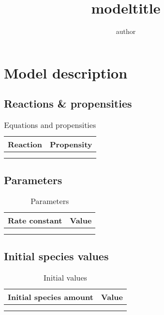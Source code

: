 \documentclass[11pt]{article}
\begin{document}
\title{
{{modeltitle}}
}
\author{
{{author}}
}
\maketitle

\section{Model description}
\subsection{Reactions \& propensities}
\begin{table}[h]
    \centering
    \caption{\small Equations and propensities}
    \begin{tabular}{l|r}
    {\bf Reaction } & {\bf Propensity } \\
    \hline
    {%
        {%
            {{cell}}
            {%
               &
            {%
        {%
        \\
    {%
    \end{tabular}
    \label{tab:equations}
\end{table}


\subsection{Parameters}
\begin{table}[h]
    \centering
    \caption{\small Parameters}
    \begin{tabular}{r|l}
    {\bf Rate constant } & {\bf Value } \\
    \hline
    {%
        {%
            $ 
            {{cell}} 
            $
            {%
               &
            {%
        {%
        \\
    {%
    \end{tabular}
    \label{tab:rates}
\end{table}

\subsection{Initial species values}
\begin{table}[h]
    \centering
    \caption{\small Initial values}
    \begin{tabular}{r|l}
    {\bf Initial species amount } & {\bf Value } \\
    \hline
    {%
        {%
            $ 
            {{cell}} 
            $
            {%
               &
            {%
        {%
        \\
    {%
    \end{tabular}
    \label{tab:initialvalues}
\end{table}
\end{document}
